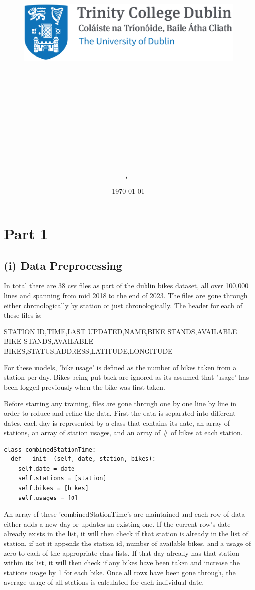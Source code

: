\documentclass{article}
\title{
\vspace{-1in}
\begin{figure}[!ht]
\flushleft
\includegraphics[width=0.4\linewidth]{reduced-trinity.png}
\end{figure}
\vspace{-0.5cm}
\hrulefill \\
\vspace{0.5cm}
\textmd{\textbf{\moduleCode\ \moduleName}}\\
\textmd{\textbf{\assignmentTitle}}\\
\vspace{0.5cm}
\hrulefill \\
}
\author{\textbf{\authorName,\ \authorID}}
\date{\today}
\begin{document}
\captionsetup{width=.8\linewidth} 

\maketitle



\section{Part 1}

\subsection{(i) Data Preprocessing}

In total there are 38 csv files as part of the dublin bikes dataset, all over 100,000 lines and spanning from mid 2018 to the end of 2023. The files are gone through either chronologically by station or just chronologically. The header for each of these files is:
\begin{center}
STATION ID,TIME,LAST UPDATED,NAME,BIKE STANDS,AVAILABLE BIKE STANDS,AVAILABLE BIKES,STATUS,ADDRESS,LATITUDE,LONGITUDE
\end{center}

For these models, 'bike usage' is defined as the number of bikes taken from a station per day. Bikes being put back are ignored as its assumed that 'usage' has been logged previously when the bike was first taken.

Before starting any training, files are gone through one by one line by line in order to reduce and refine the data. First the data is separated into different dates, each day is represented by a class that contains its date, an array of stations, an array of station usages, and an array of \# of bikes at each station.

\begin{lstlisting}
class combinedStationTime:
  def __init__(self, date, station, bikes):
    self.date = date
    self.stations = [station]
    self.bikes = [bikes]
    self.usages = [0]
\end{lstlisting}
    
An array of these 'combinedStationTime's are maintained and each row of data either adds a new day or updates an existing one. If the current row's date already exists in the list, it will then check if that station is already in the list of station, if not it appends the station id, number of available bikes, and a usage of zero to each of the appropriate class lists. If that day already has that station within its list, it will then check if any bikes have been taken and increase the stations usage by 1 for each bike. Once all rows have been gone through, the average usage of all stations is calculated for each individual date.
\end{document}
